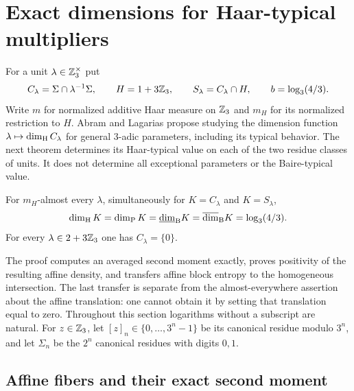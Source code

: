 \section{Exact dimensions for Haar-typical multipliers}
\label{typical:section}

For a unit $\lambda\in\mathbb Z_3^\times$ put
\[
 C_\lambda=\Sigma\cap\lambda^{-1}\Sigma,
 \qquad H=1+3\mathbb Z_3,
 \qquad S_\lambda=C_\lambda\cap H,
 \qquad b=\log_3(4/3).
\]
Write $m$ for normalized additive Haar measure on $\mathbb Z_3$ and $m_H$
for its normalized restriction to $H$. Abram and Lagarias
\cite[Section~2.4]{AL2014} propose studying the dimension function
$\lambda\mapsto\dim_{\mathrm H} C_\lambda$ for general $3$-adic parameters,
including its typical behavior. The next theorem determines its
Haar-typical value on each of the two residue classes of units.
It does not determine all exceptional parameters or the Baire-typical
value.

\begin{theorem}\label{typical:main}
For $m_H$-almost every $\lambda$, simultaneously for
$K=C_\lambda$ and $K=S_\lambda$,
\begin{equation}\label{typical:four-dimensions}
 \dim_{\mathrm H} K=\dim_{\mathrm P} K=\underline{\dim}_{\mathrm B}K
       =\overline{\dim}_{\mathrm B}K=\log_3(4/3).
\end{equation}
For every $\lambda\in2+3\mathbb Z_3$ one has $C_\lambda=\{0\}$.
\end{theorem}

The proof computes an averaged second moment exactly, proves positivity
of the resulting affine density, and transfers affine block entropy
to the homogeneous intersection. The last transfer is separate from
the almost-everywhere assertion about the affine translation: one
cannot obtain it by setting that translation equal to zero.
Throughout this section logarithms without a subscript are natural.
For $z\in\mathbb Z_3$, let $[z]_n\in\{0,\ldots,3^n-1\}$ be its canonical
residue modulo $3^n$, and let $\Sigma_n$ be the $2^n$ canonical
residues with digits $0,1$.

\subsection{Affine fibers and their exact second moment}

